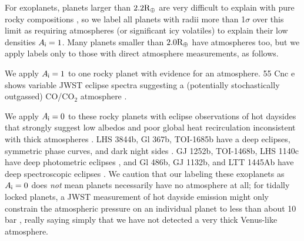 \documentclass[modern,linenumbers,trackchanges]{aastex7}
\begin{document}
For exoplanets, planets larger than $2.2 \rm {R_\oplus}$ are very difficult to explain with pure rocky compositions \citep{rogersMost16Earthradius2015b, zengNewPerspectivesExoplanet2021, rogersMostSuperEarthsHave2025}, so we label all planets 
with radii more than 1$\sigma$ over this limit as requiring atmospheres (or significant icy volatiles) to explain their low densities $A_{\sf i} = 1$. Many planets smaller than $2.0 \rm {R_\oplus}$ have atmospheres too, but we apply labels only to those with direct atmosphere measurements, as follows.

We apply $A_{\sf i} = 1$ to one rocky planet with evidence for an atmosphere. 55 Cnc e shows variable JWST eclipse spectra suggesting a (potentially stochastically outgassed) CO/CO$_2$ atmosphere \citep{huSecondaryAtmosphereRocky2024, patelSecondaryAtmosphereRocky2024}. 

We apply $A_{\sf i} = 0$ to these rocky planets with eclipse observations of hot daysides that strongly suggest low albedos and poor global heat recirculation inconsistent with thick atmospheres \citep[see][]{kollIdentifyingCandidateAtmospheres2019c, mansfieldIdentifyingAtmospheresRocky2019b}. LHS 3844b, Gl 367b, TOI-1685b have a deep eclipses, symmetric phase curves, and dark night sides \citep{kreidbergAbsenceThickAtmosphere2019a, zhangGJ367bDark2024, luqueDarkBareRock2024}. GJ 1252b, TOI-1468b, LHS 1140c have deep photometric eclipses \citep{crossfieldGJ1252bHot2022, meiervaldesHotRocksSurvey2025, fortuneHotRocksSurvey2025a}, and
Gl 486b, GJ 1132b, and LTT 1445Ab have deep spectroscopic eclipses \citep{weinermansfieldNoThickAtmosphere2024, xueJWSTThermalEmission2024a, wachiraphanThermalEmissionSpectrum2025a}. We caution that our labeling these exoplanets as $A_{\sf i} = 0$ does {\em not} mean planets necessarily have no atmosphere at all; for tidally locked planets, a JWST measurement of hot dayside emission might only constrain the atmospheric pressure on an individual planet to less than about 10 bar \citep{kollScalingAtmosphericHeat2022}, really saying simply that we have not detected a very thick Venus-like atmosphere.
\end{document}
